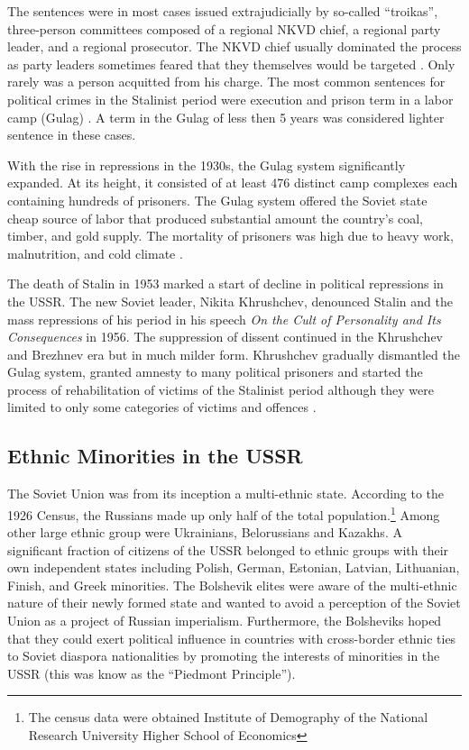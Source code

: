 The sentences were in most cases issued extrajudicially by so-called \enquote{troikas}, three-person committees composed of a regional NKVD chief, a regional party leader, and a regional prosecutor. The NKVD chief usually dominated the process as party leaders sometimes feared that they themselves would be targeted \citep[p. 82]{snyder_bloodlands:_2011}. Only rarely was a person acquitted from his charge. 
The most common sentences for political crimes in the Stalinist period were  execution and prison term in a labor camp (Gulag) \citep[p. 21]{gregory_terror_2009}. 
A term in the Gulag of less then 5 years was considered lighter sentence in these cases.

 With the rise in  repressions in the 1930s, the Gulag system significantly expanded. At its height, it consisted of at least 476 distinct camp complexes each containing hundreds of prisoners. The Gulag system offered the Soviet state cheap source of labor that produced substantial amount the country's coal, timber, and gold supply. The mortality of prisoners was high due to heavy work, malnutrition, and cold climate \citep{applebaum_gulag:_2003}. 

The death of Stalin in 1953 marked a start of decline in political repressions in the USSR. The new Soviet leader, Nikita Khrushchev, denounced Stalin and the mass repressions of his period in his speech \emph{On the Cult of Personality and Its Consequences} in 1956. The suppression of dissent continued in the Khrushchev and  Brezhnev era but in much milder form. Khrushchev gradually dismantled the Gulag system, granted amnesty to many political prisoners and started the process of rehabilitation of victims of the Stalinist period although they were limited to only some categories of victims and offences \citep{applebaum_gulag:_2003, dobson_khrushchevs_2009}. 

\subsection{Ethnic Minorities in the USSR}
The Soviet Union was from its inception a multi-ethnic state. 
According to the 1926 Census, the Russians made up only half of the total population.\footnote{The census data were obtained  Institute of Demography of the National Research University Higher School of Economics} Among other large ethnic group were Ukrainians, Belorussians and Kazakhs.  A significant fraction of citizens of the USSR belonged to ethnic groups with their own independent states including Polish, German, Estonian, Latvian, Lithuanian, Finish,  and Greek minorities. 
The Bolshevik elites were aware of the multi-ethnic nature of their newly formed state and wanted to  avoid a perception of the Soviet Union as a project of Russian imperialism. Furthermore, the Bolsheviks hoped that
they could exert political influence in countries with cross-border ethnic  ties to Soviet diaspora nationalities 
by promoting the interests of minorities in the USSR (this was know as the \enquote{Piedmont Principle}).

